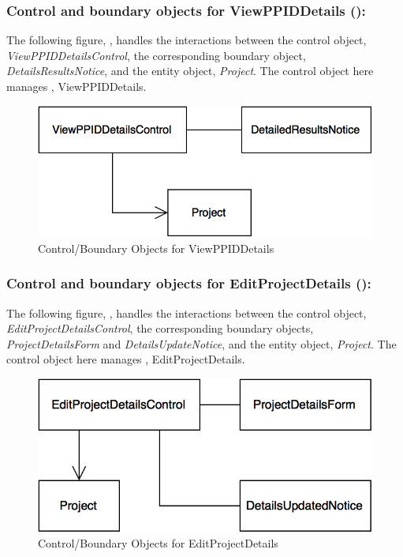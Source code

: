 \documentclass[12pt,letterpaper]{article}
\begin{document}
\subsubsection*{Control and boundary objects for ViewPPIDDetails ():}

The following figure, , handles the interactions between the control object, {\it ViewPPIDDetailsControl}, the corresponding boundary object, 
{\it DetailsResultsNotice}, and the entity object, {\it Project}. The control object here manages , ViewPPIDDetails.

\vspace{1em}

\begin{figure}[H]
	\centering{}
	\includegraphics[scale=0.37]{imgs/cbod/view-ppid-details.png}
	\caption{Control/Boundary Objects for ViewPPIDDetails}
\end{figure}

\newpage{}

\subsubsection*{Control and boundary objects for EditProjectDetails ():}

The following figure, , handles the interactions between the control object, {\it EditProjectDetailsControl}, the corresponding boundary objects, {\it ProjectDetailsForm} and {\it DetailsUpdateNotice}, and the entity object, {\it Project}. The control object here manages , EditProjectDetails.

\begin{figure}[H]
	\centering{}
	\includegraphics[scale=0.37]{imgs/cbod/edit-project-details.png}
	\caption{Control/Boundary Objects for EditProjectDetails}
\end{figure}
\end{document}
